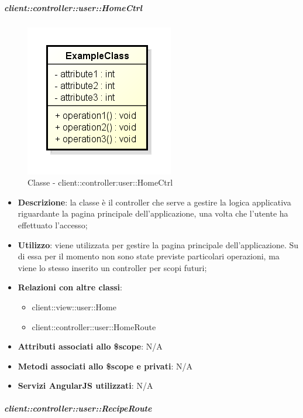 		\subparagraph{client::controller::user::HomeCtrl} %
		\label{subp:client_controller_user_homectrl}
			\begin{figure}[htbp]
				\centering
				\centerline{\includegraphics[scale=0.7]{./images/client/classes/example_class.png}}
				\caption{Classe - client::controller:user::HomeCtrl}
			\end{figure}
			\begin{itemize}
				\item \textbf{Descrizione}: la classe è il controller che serve a gestire la logica applicativa riguardante la pagina principale dell'applicazione, una volta che l'utente ha effettuato l'accesso;
				\item \textbf{Utilizzo}: viene utilizzata per gestire la pagina principale dell'applicazione. Su di essa per il momento non sono state previste particolari operazioni, ma viene lo stesso inserito un controller per scopi futuri;
				\item \textbf{Relazioni con altre classi}:
					\begin{itemize}
						\item client::view::user::Home
						\item client::controller::user::HomeRoute
					\end{itemize}

				\item \textbf{Attributi associati allo \$scope}: N/A

				\item \textbf{Metodi associati allo \$scope e privati}: N/A

				\item \textbf{Servizi AngularJS utilizzati}: N/A

			\end{itemize}

		\subparagraph{client::controller::user::RecipeRoute} %
		\label{subp:bdsm_app_client_controller_user_reciperouteconfig}

